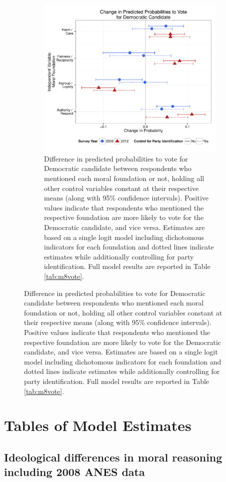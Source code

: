 \documentclass[12pt]{article}
\begin{document}
\begin{figure}[h]
\begin{subfigure}[t]{0.49\textwidth}
  \end{subfigure}
  \begin{subfigure}[t]{0.49\textwidth}
    \includegraphics[scale=.4]{../calc/fig/appD12vote.pdf}
    \caption{Difference in predicted probabilities to vote for Democratic candidate between respondents who mentioned each moral foundation or not, holding all other control variables constant at their respective means (along with 95\% confidence intervals). Positive values indicate that respondents who mentioned the respective foundation are more likely to vote for the Democratic candidate, and vice versa. Estimates are based on a single logit model including dichotomous indicators for each foundation and dotted lines indicate estimates while additionally controlling for party identification. Full model results are reported in Table \ref{tab:m8vote}.}\label{fig:appD12vote}
  \end{subfigure}
\end{figure}


\clearpage
\section{Tables of Model Estimates}\label{app:tables}
\renewcommand\thefigure{\thesection.\arabic{figure}}
\renewcommand\thetable{\thesection.\arabic{table}}
\setcounter{figure}{0}
\setcounter{table}{0}


\subsection{Ideological differences in moral reasoning including 2008 ANES data}
\end{document}
